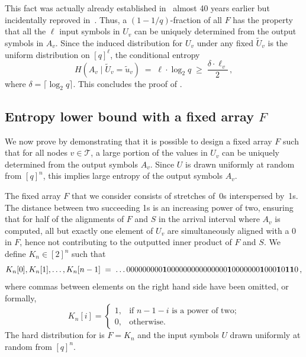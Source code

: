 \documentclass{toc}
\newcommand{\calT}{\ensuremath{\mathcal{T}}}
\newcommand{\Xv}{\ensuremath{U_v}}
\newcommand{\Xvknown}{\ensuremath{\widetilde{U}_v}}
\newcommand{\Xvfix}{\ensuremath{\widetilde{u}_v}}
\newcommand{\Yv}{\ensuremath{A_v}}
\begin{document}
This fact was actually already established in~\cite{Day1960:Matrices} almost 40 years earlier but incidentally reproved in~\cite{KL1996:Toeplitz}.
%
Thus,
a $(1-1/q)$-fraction of all $F$ has the property that all the $\ell$ input symbols in $\Xv$ can be uniquely determined from the output symbols in $\Yv$.
Since the induced distribution for $\Xv$ under any fixed $\Xvknown$ is the uniform distribution on $[q]^\ell$, the conditional entropy
\[
H(\Yv\mid\Xvknown=\Xvfix)
\;=\;
\ell \cdot \log_2 q
\;\geq\;
\frac{\delta \cdot \ell_v}{2}\,,
\]
where $\delta=\lceil\log_2 q\rceil$.
This concludes the proof of .
%


\subsection{Entropy lower bound with a fixed array \texorpdfstring{$F$}{F}} \label{sec:conv-fixed-F}

We now prove  by demonstrating that it is possible to design a fixed array $F$ such that for all nodes $v\in\calT$, a large portion of the values in $\Xv$ can be uniquely determined from the output symbols $\Yv$. Since $U$ is drawn uniformly at random from $[q]^n$, this implies large entropy of the output symbols $\Yv$.

The fixed array $F$ that we consider consists of stretches of~0s interspersed by~1s. The distance between two succeeding 1s is an increasing power of two, ensuring that for half of the alignments of $F$ and $S$ in the arrival interval where $\Yv$ is %
computed, all but exactly one element of $U_v$ are simultaneously aligned with a 0 in $F$, hence not contributing to the outputted inner product of $F$ and $S$. We define $K_n\in[2]^n$ such that
%
\begin{equation*}
K_n[0],K_n[1],\dots,K_n[n-1]\;=\;\dots000000000{\bf 1}000000000000000{\bf 1}0000000{\bf 1}000{\bf 1}0{\bf 11}0\,,
\end{equation*}
where commas between elements on the right hand side have been omitted, or formally,
%
\begin{equation*}
%
K_n[i] =
\begin{cases}
1, &\text{if $n-1-i$ is a power of two;}\\
0, &\text{otherwise.}
\end{cases}
\end{equation*}
%
The hard distribution for  is $F=K_n$ and the input symbols $U$ drawn uniformly at random from $[q]^n$.
\end{document}
